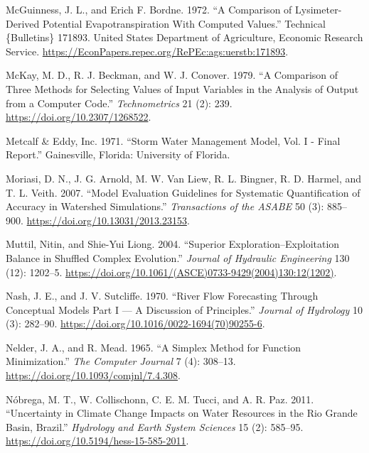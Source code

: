 \documentclass[
  letterpaper,
  DIV=11,
  numbers=noendperiod]{scrreprt}
\newlength{\cslhangindent}
\newlength{\cslentryspacingunit} %
\newenvironment{CSLReferences}[2] %
 {%
  \setlength{\parindent}{0pt}
  \ifodd #1
  \let\oldpar\par
  \def\par{\hangindent=\cslhangindent\oldpar}
  \fi
  \setlength{\parskip}{#2\cslentryspacingunit}
 }%
 {}
\begin{document}
\begin{CSLReferences}{1}{0}
\leavevmode{}%
McGuinness, J. L., and Erich F. Bordne. 1972. {``A {Comparison} of
{Lysimeter}-{Derived} {Potential} {Evapotranspiration} {With} {Computed}
{Values}.''} Technical \{Bulletins\} 171893. United States Department of
Agriculture, Economic Research Service.
\url{https://EconPapers.repec.org/RePEc:ags:uerstb:171893}.

\leavevmode{}%
McKay, M. D., R. J. Beckman, and W. J. Conover. 1979. {``A {Comparison}
of {Three} {Methods} for {Selecting} {Values} of {Input} {Variables} in
the {Analysis} of {Output} from a {Computer} {Code}.''}
\emph{Technometrics} 21 (2): 239. \url{https://doi.org/10.2307/1268522}.

\leavevmode{}%
Metcalf \& Eddy, Inc. 1971. {``Storm {Water} {Management} {Model},
{Vol}. {I} - {Final} {Report}.''} Gainesville, Florida: University of
Florida.

\leavevmode{}%
Moriasi, D. N., J. G. Arnold, M. W. Van Liew, R. L. Bingner, R. D.
Harmel, and T. L. Veith. 2007. {``Model {Evaluation} {Guidelines} for
{Systematic} {Quantification} of {Accuracy} in {Watershed}
{Simulations}.''} \emph{Transactions of the ASABE} 50 (3): 885--900.
\url{https://doi.org/10.13031/2013.23153}.

\leavevmode{}%
Muttil, Nitin, and Shie-Yui Liong. 2004. {``Superior
{Exploration}--{Exploitation} {Balance} in {Shuffled} {Complex}
{Evolution}.''} \emph{Journal of Hydraulic Engineering} 130 (12):
1202--5.
\url{https://doi.org/10.1061/(ASCE)0733-9429(2004)130:12(1202)}.

\leavevmode{}%
Nash, J. E., and J. V. Sutcliffe. 1970. {``River Flow Forecasting
Through Conceptual Models Part {I} --- {A} Discussion of Principles.''}
\emph{Journal of Hydrology} 10 (3): 282--90.
\url{https://doi.org/10.1016/0022-1694(70)90255-6}.

\leavevmode{}%
Nelder, J. A., and R. Mead. 1965. {``A {Simplex} {Method} for {Function}
{Minimization}.''} \emph{The Computer Journal} 7 (4): 308--13.
\url{https://doi.org/10.1093/comjnl/7.4.308}.

\leavevmode{}%
Nóbrega, M. T., W. Collischonn, C. E. M. Tucci, and A. R. Paz. 2011.
{``Uncertainty in Climate Change Impacts on Water Resources in the {Rio}
{Grande} {Basin}, {Brazil}.''} \emph{Hydrology and Earth System
Sciences} 15 (2): 585--95.
\url{https://doi.org/10.5194/hess-15-585-2011}.


\end{CSLReferences}
\end{document}
